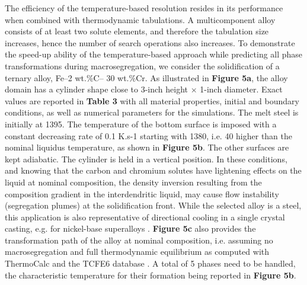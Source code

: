 The efficiency of the temperature-based resolution resides in its performance when combined with 
thermodynamic tabulations. A multicomponent alloy consists of at least two solute elements, and 
therefore the tabulation size increases, hence the number of search operations also increases. 
To demonstrate the speed-up ability of the temperature-based approach while predicting all phase 
transformations during macrosegregation, we consider the solidification of a ternary alloy, Fe–2 wt.\%C– 30 wt.\%Cr. 
As illustrated in \textbf{Figure 5a}, the alloy domain has a cylinder shape close to 3-inch height × 1-inch diameter. 
Exact values are reported in \textbf{Table 3} with all material properties, initial and boundary conditions, 
as well as numerical parameters for the simulations. The melt steel is initially at \SI{1395}{\udegC}. The 
temperature of the bottom surface is imposed with a constant decreasing rate of 0.1 K.s-1 starting 
with \SI{1380}{\udegC}, i.e. \SI{40}{\udegC} higher than the nominal liquidus temperature, as shown 
in \textbf{Figure 5b}. The other surfaces are kept adiabatic. The cylinder is held in a vertical position. 
In these conditions, and knowing that the carbon and chromium solutes have lightening effects on the liquid 
at nominal composition, the density inversion resulting from the composition gradient in the interdendritic 
liquid, may cause flow instability (segregation plumes) at the solidification front. While the selected alloy 
is a steel, this application is also representative of directional cooling in a single crystal casting, e.g. 
for nickel-base superalloys \citep{beckermann_development_2000}. \textbf{Figure 5c} also provides the 
transformation path of the alloy at nominal composition, i.e. assuming no macrosegregation and full 
thermodynamic equilibrium as computed with ThermoCalc and the TCFE6 database \citep{thermo-calc_andersson, tcfe6}. 
A total of 5 phases need to be handled, the characteristic temperature for their formation being reported 
in \textbf{Figure 5b}. 
 

